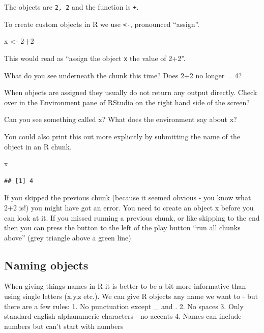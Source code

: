 \documentclass[]{book}
\newenvironment{Shaded}{\begin{snugshade}}{\end{snugshade}}
\newcommand{\DecValTok}[1]{\textcolor[rgb]{0.00,0.00,0.81}{#1}}
\newcommand{\NormalTok}[1]{#1}
\newcommand{\OperatorTok}[1]{\textcolor[rgb]{0.81,0.36,0.00}{\textbf{#1}}}
\newcommand{\StringTok}[1]{\textcolor[rgb]{0.31,0.60,0.02}{#1}}
\begin{document}
The objects are \texttt{2,\ 2} and the function is \texttt{+}.

To create custom objects in R we use \texttt{\textless{}-}, pronounced ``assign''.

\begin{Shaded}
\begin{Highlighting}[]
\NormalTok{x <-}\StringTok{ }\DecValTok{2}\OperatorTok{+}\DecValTok{2}
\end{Highlighting}
\end{Shaded}

This would read as ``assign the object \texttt{x} the value of 2+2''.

What do you see underneath the chunk this time? Does 2+2 no longer = 4?

When objects are assigned they usually do not return any output directly. Check over in the Environment pane of RStudio on the right hand side of the screen?

Can you see something called x? What does the environment say about x?

You could also print this out more explicitly by submitting the name of the object in an R chunk.

\begin{Shaded}
\begin{Highlighting}[]
\NormalTok{x}
\end{Highlighting}
\end{Shaded}

\begin{verbatim}
## [1] 4
\end{verbatim}

If you skipped the previous chunk (because it seemed obvious - you know what 2+2 is!) you might have got an error. You need to create an object x before you can look at it. If you missed running a previous chunk, or like skipping to the end then you can press the button to the left of the play button ``run all chunks above'' (grey triangle above a green line)

\hypertarget{naming-objects}{%
\subsection{Naming objects}\label{naming-objects}}

When giving things names in R it is better to be a bit more informative than using single letters (x,y,z etc.).
We can give R objects any name we want to - but there are a few rules:
1. No punctuation except \_ and .
2. No spaces
3. Only standard english alphanumeric characters - no accents
4. Names can include numbers but can't start with numbers
\end{document}
